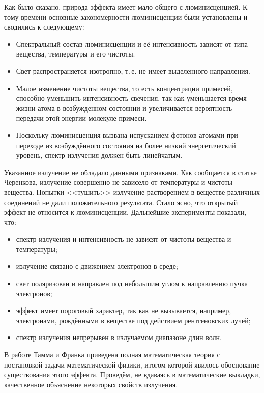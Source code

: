 \documentclass[12pt,a4paper]{report} %
\begin{document}
Как было сказано, природа эффекта имеет мало общего с люминисценцией. К тому времени основные закономерности люминисценции были установлены и сводились к следующему:
\begin{itemize}
    \item Спектральный состав люминисценции и её интенсивность зависят от типа вещества, температуры и его чистоты.
    \item Свет распространяется изотропно, т.\,е. не имеет выделенного направления.
    \item Малое изменение чистоты вещества, то есть концентрации примесей, способно уменьшить интенсивность свечения, так как уменьшается время жизни атома в возбужденном состоянии и увеличивается вероятность передачи этой энергии молекуле примеси.
    \item Поскольку люминисценция вызвана испусканием фотонов атомами при переходе из возбуждённого состояния на более низкий энергетический уровень, спектр излучения должен быть линейчатым.
\end{itemize}

Указанное излучение не обладало данными признаками. Как сообщается в статье Черенкова, излучение совершенно не зависело от температуры и чистоты вещества. Попытки <<тушить>> излучение растворением в веществе различных соединений не дали положительного результата. Стало ясно, что открытый эффект не относится к люминисценции. Дальнейшие эксперименты показали, что:
\begin{itemize}
    \item спектр излучения и интенсивность не зависят от чистоты вещества и температуры;
    \item излучение связано с движением электронов в среде;
    \item свет поляризован и направлен под небольшим углом к направлению пучка электронов;
    \item эффект имеет пороговый характер, так как не вызывается, например, электронами, рождёнными в веществе под действием рентгеновских лучей;
    \item спектр излучения непрерывен в излучаемом диапазоне длин волн.
\end{itemize}

В работе Тамма и Франка приведена полная математическая теория с постановкой задачи математической физики, итогом которой явилось обоснование существования этого эффекта. Проведём, не вдаваясь в математические выкладки, качественное объяснение некоторых свойств излучения. 
\end{document}
